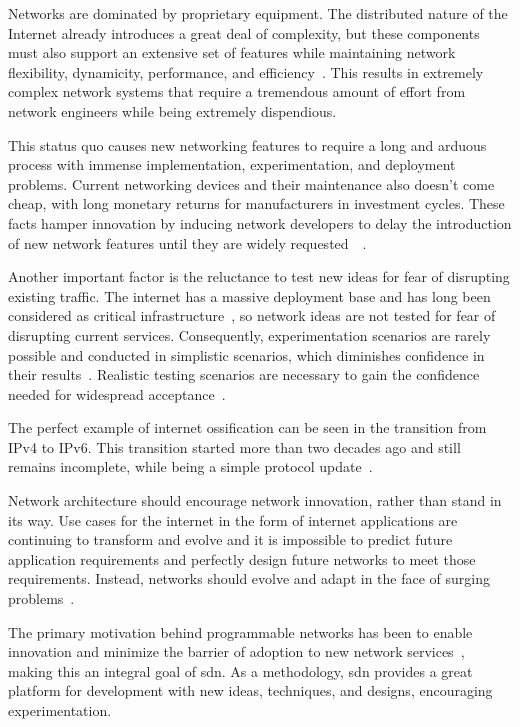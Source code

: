 Networks are dominated by proprietary equipment. The distributed nature of the Internet already introduces a great deal of complexity, but these components must also support an extensive set of features while maintaining network flexibility, dynamicity, performance, and efficiency~\cite{feamster_road_2013}. This results in extremely complex network systems that require a tremendous amount of effort from network engineers while being extremely dispendious.

This status quo causes new networking features to require a long and arduous process with immense implementation, experimentation, and deployment problems. Current networking devices and their maintenance also doesn't come cheap, with long monetary returns for manufacturers in investment cycles. These facts hamper innovation by inducing network developers to delay the introduction of new network features until they are widely requested~\cite{bifulco_survey_2018}~\cite{kreutz_software-defined_2015}. 

Another important factor is the reluctance to test new ideas for fear of disrupting existing traffic. The internet has a massive deployment base and has long been considered as critical infrastructure~\cite{nunes_survey_2014}, so network ideas are not tested for fear of disrupting current services. Consequently, experimentation scenarios are rarely possible and conducted in simplistic scenarios, which diminishes confidence in their results~\cite{xia_survey_2015}. Realistic testing scenarios are necessary to gain the confidence needed for widespread acceptance~\cite{mckeown_openflow_2008}.

The perfect example of internet ossification can be seen in the transition from IPv4 to IPv6. This transition started more than two decades ago and still remains incomplete, while being a simple protocol update~\cite{kreutz_software-defined_2015}.

Network architecture should encourage network innovation, rather than stand in its way. Use cases for the internet in the form of internet applications are continuing to transform and evolve and it is impossible to predict future application requirements and perfectly design future networks to meet those requirements. Instead, networks should evolve and adapt in the face of surging problems~\cite{xia_survey_2015}. 

The primary motivation behind programmable networks has been to enable innovation and minimize the barrier of adoption to new network services~\cite{feamster_road_2013}, making this an integral goal of \gls{sdn}. As a methodology, \gls{sdn} provides a great platform for development with new ideas, techniques, and designs, encouraging experimentation.


